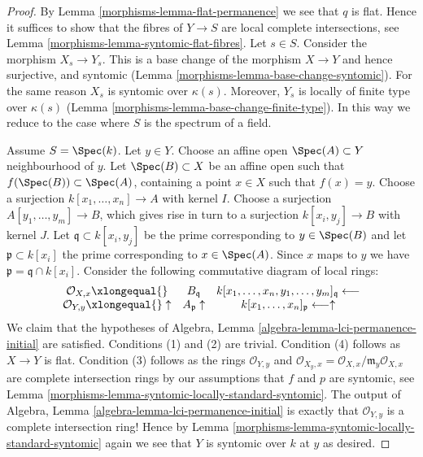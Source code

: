 \begin{proof}

By Lemma \ref{morphisms-lemma-flat-permanence} we see that $q$ is flat.
Hence it suffices to show that the fibres of $Y \to S$ are
local complete intersections, see Lemma \ref{morphisms-lemma-syntomic-flat-fibres}.
Let $s \in S$. Consider the morphism $X_s \to Y_s$.
This is a base change of the morphism $X \to Y$ and hence
surjective, and syntomic (Lemma \ref{morphisms-lemma-base-change-syntomic}).
For the same reason $X_s$ is syntomic over $\kappa(s)$.
Moreover, $Y_s$ is locally of finite type over $\kappa(s)$
(Lemma \ref{morphisms-lemma-base-change-finite-type}). In this way
we reduce to the case where $S$ is the spectrum of a field.

\medskip\noindent
Assume $S = \Spec(k)$. Let $y \in Y$. Choose an affine
open $\Spec(A) \subset Y$ neighbourhood of $y$. Let
$\Spec(B) \subset X$ be an affine open such that
$f(\Spec(B)) \subset \Spec(A)$, containing
a point $x \in X$ such that $f(x) = y$. Choose a surjection
$k[x_1, \ldots, x_n] \to A$ with kernel $I$.
Choose a surjection $A[y_1, \ldots, y_m] \to B$, which gives
rise in turn to a surjection $k[x_i, y_j] \to B$ with kernel $J$.
Let $\mathfrak q \subset k[x_i, y_j]$ be the prime corresponding
to $y \in \Spec(B)$ and let $\mathfrak p \subset k[x_i]$ the prime
corresponding to $x \in \Spec(A)$.
Since $x$ maps to $y$ we have $\mathfrak p = \mathfrak q \cap k[x_i]$.
Consider the following commutative diagram of local rings:
$$
\begin{array}{ccc}\mathcal{O}_{X, x} \xlongequal{} & B_{\mathfrak q} & k[x_1, \ldots, x_n, y_1, \ldots, y_m]_{\mathfrak q} \longleftarrow \\ \mathcal{O}_{Y, y} \xlongequal{}\uparrow & A_{\mathfrak p} \uparrow & k[x_1, \ldots, x_n]_{\mathfrak p} \longleftarrow\uparrow\end{array}
$$
We claim that the hypotheses of
Algebra, Lemma \ref{algebra-lemma-lci-permanence-initial} are satisfied.
Conditions (1) and (2) are trivial. Condition (4) follows as
$X \to Y$ is flat. Condition (3) follows as the rings
$\mathcal{O}_{Y, y}$ and
$\mathcal{O}_{X_y, x} = \mathcal{O}_{X, x}/\mathfrak m_y\mathcal{O}_{X, x}$
are complete intersection rings by our assumptions that
$f$ and $p$ are syntomic, see
Lemma \ref{morphisms-lemma-syntomic-locally-standard-syntomic}.
The output of Algebra, Lemma \ref{algebra-lemma-lci-permanence-initial}
is exactly that $\mathcal{O}_{Y, y}$ is a complete intersection
ring! Hence by Lemma \ref{morphisms-lemma-syntomic-locally-standard-syntomic}
again we see that $Y$ is syntomic over $k$ at $y$ as desired.
\end{proof}

